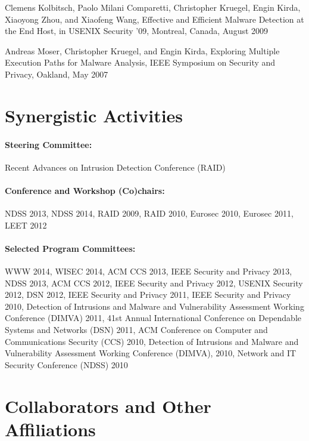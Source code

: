 \documentclass[letterpaper,11pt]{scrartcl}
\begin{document}
\vspace*{1em}
\noindent Clemens Kolbitsch, Paolo Milani Comparetti, Christopher Kruegel, Engin
Kirda, Xiaoyong Zhou, and Xiaofeng Wang, Effective and Efficient
Malware Detection at the End Host, in USENIX Security '09, Montreal,
Canada, August 2009

\vspace*{1em}
\noindent Andreas Moser, Christopher Kruegel, and Engin Kirda, Exploring
Multiple Execution Paths for Malware Analysis, IEEE Symposium on
Security and Privacy, Oakland, May 2007

\section*{Synergistic Activities}

\paragraph{Steering Committee:}
Recent Advances on Intrusion Detection Conference (RAID)

\paragraph{Conference and Workshop (Co)chairs:} NDSS 2013, NDSS 2014, RAID 2009, RAID 2010,
Eurosec 2010, Eurosec 2011, LEET 2012

\paragraph{Selected Program Committees:}
WWW 2014, WISEC 2014, ACM CCS 2013, IEEE Security and Privacy 2013,
NDSS 2013, ACM CCS 2012, IEEE Security and Privacy 2012, USENIX
Security 2012, DSN 2012, IEEE Security and Privacy 2011, IEEE Security
and Privacy 2010, Detection of Intrusions and Malware and
Vulnerability Assessment Working Conference (DIMVA) 2011, 41st Annual
International Conference on Dependable Systems and Networks (DSN)
2011, ACM Conference on Computer and Communications Security (CCS)
2010, Detection of Intrusions and Malware and Vulnerability Assessment
Working Conference (DIMVA), 2010, Network and IT Security Conference
(NDSS) 2010

\section*{Collaborators and Other Affiliations}
\end{document}
